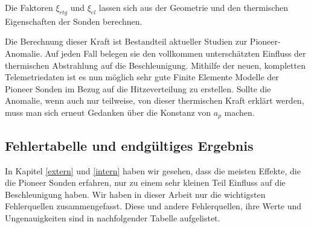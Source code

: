 Die Faktoren $\xi _{\mathit{rtg}}$ und $\xi _{\mathit{el}}$ lassen
sich aus der Geometrie und den thermischen Eigenschaften der Sonden
berechnen\cite{Turyshev2010}.

Die Berechnung dieser Kraft ist Bestandteil aktueller Studien zur
Pioneer-Anomalie. Auf jeden Fall belegen sie den vollkommen
untersch\"atzten Einfluss der thermischen Abstrahlung auf die
Beschleunigung. Mithilfe der neuen, kompletten Telemetriedaten ist es
nun m\"oglich sehr gute Finite Elemente Modelle der Pioneer Sonden im
Bezug auf die Hitzeverteilung zu erstellen. Sollte die Anomalie, wenn
auch nur teilweise, von dieser thermischen Kraft erkl\"art werden, muss
man sich erneut Gedanken \"uber die Konstanz von $a_{p}$ machen.


\bigskip

\subsection{ Fehlertabelle und endg\"ultiges Ergebnis}

In Kapitel \ref{extern} und \ref{intern} haben wir gesehen, dass die meisten Effekte, die 
die Pioneer Sonden erfahren, nur zu einem sehr kleinen Teil Einfluss auf die
Beschleunigung haben. Wir haben in dieser Arbeit nur die wichtigsten
Fehlerquellen zusammengefasst. Diese und andere Fehlerquellen, ihre
Werte und Ungenauigkeiten sind in nachfolgender Tabelle aufgelistet.


